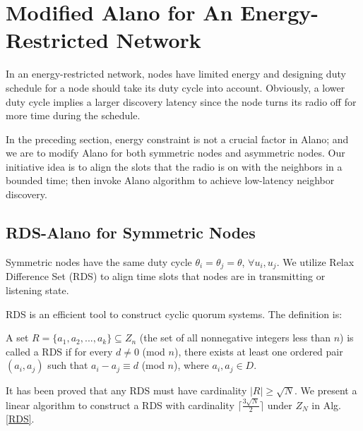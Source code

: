 \section{Modified Alano for An Energy-Restricted Network}
\label{EEN}
In an energy-restricted network, nodes have limited energy and designing duty schedule for a node should take its duty cycle into account. Obviously, a lower duty cycle implies a larger discovery latency since the node turns its radio off for more time during the schedule. 

In the preceding section, energy constraint is not a crucial factor in Alano; and we are to modify Alano for both symmetric nodes and asymmetric nodes.
Our initiative idea is to align the slots that the radio is on with the neighbors in a bounded time; then invoke Alano algorithm to achieve low-latency neighbor discovery. 


\subsection{RDS-Alano for Symmetric Nodes}


Symmetric nodes have the same duty cycle $\theta_i = \theta_j = \theta$, $\forall u_i, u_j$. We utilize Relax Difference Set (RDS) to align time slots that nodes are in transmitting or listening state.


RDS is an efficient tool to construct cyclic quorum systems\cite{jiang2005quorum,luk1997two}. The definition is:
\begin{definition}
A set $R=\{a_1,a_2,...,a_k\} \subseteq Z_n$ (the set of all nonnegative integers less than $n$)
is called a RDS if for every $d \neq 0$ (mod $n$),
there exists at least one ordered pair $(a_i,a_j)$ such that $a_i - a_j \equiv d$ (mod $n$), where $a_i,a_j \in D$.
\end{definition}


It has been proved that any RDS must have cardinality $|R| \geq \sqrt{N}$\cite{luk1997two}.
We present a linear algorithm to construct a RDS with cardinality $\lceil \frac{3\sqrt{N}}{2}  \rceil$ under $Z_N$ in Alg. \ref{RDS}.


